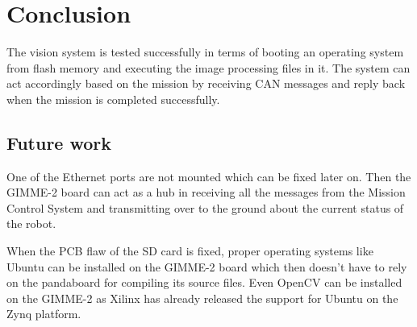 \section{Conclusion}\label{sec:conclusion}
The vision system is tested successfully in terms of booting an operating system from flash memory and executing the image processing files in it. The system can act accordingly based on the mission by receiving CAN messages and reply back when the mission is completed successfully.


\subsection{Future work}
One of the Ethernet ports are not mounted which can be fixed later on. Then the GIMME-2 board can act as a hub in receiving all the messages from the Mission Control System and transmitting over to the ground about the current status of the robot. 

When the PCB flaw of the SD card is fixed, proper operating systems like Ubuntu can be installed on the GIMME-2 board \cite{ubuntuZynq} which then doesn't have to rely on the pandaboard for compiling its source files. Even OpenCV can be installed on the GIMME-2 as Xilinx has already released the support for Ubuntu on the Zynq platform.
